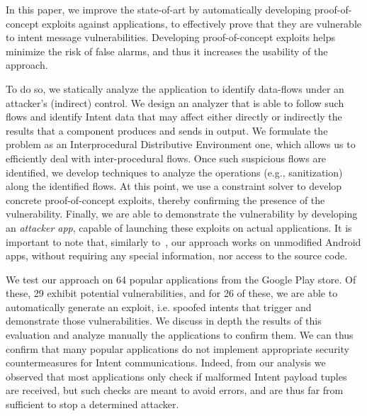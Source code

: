 In this paper, we improve the state-of-art by automatically developing proof-of-concept exploits against applications, to effectively prove that they are vulnerable to intent message vulnerabilities. Developing proof-of-concept exploits helps minimize the risk of false alarms, and thus it increases the usability of the approach. 

To do so, we statically analyze the application to identify data-flows under an attacker's (indirect) control. We design an analyzer that is able to follow such flows and identify Intent data that may affect either directly or indirectly the
results that a component produces and sends in output. We formulate the problem as
an Interprocedural Distributive Environment
one, which allows us to efficiently deal with inter-procedural flows. Once such suspicious flows are identified, we develop techniques to analyze the operations (e.g., sanitization) along the identified flows. At this point, we use a constraint solver to develop concrete proof-of-concept exploits, thereby confirming the presence of the vulnerability. Finally, we are able to demonstrate the vulnerability by developing an {\em attacker app}, capable of launching these exploits on actual applications. It is important to note that, similarly to~\cite{Lu:CHEX:2012}, our approach works on unmodified Android apps, without requiring any special information, nor access to the source code.

We test our approach on 64 popular applications from the Google Play store. Of these, 29 exhibit potential vulnerabilities, and for 26 of these, we
are able to automatically generate an exploit, i.e. spoofed intents that trigger and demonstrate those vulnerabilities. 
We discuss in depth the results of this evaluation and analyze manually the applications to confirm them.
We can thus confirm that many popular applications do not implement appropriate security countermeasures for Intent communications. Indeed, from our
analysis we observed that most applications only check if malformed Intent payload tuples are received, but such checks are meant to avoid errors, and are
thus far from sufficient to stop a determined attacker.

